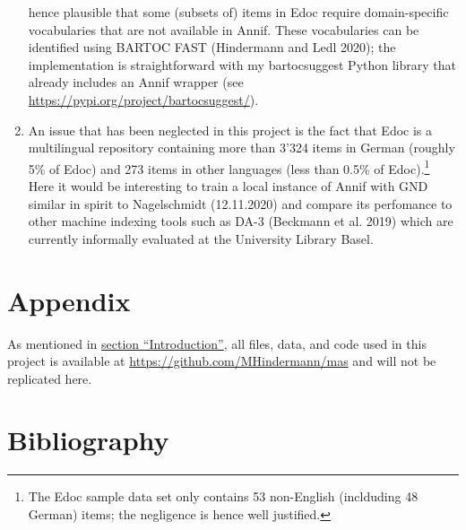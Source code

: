 \begin{enumerate}
  hence plausible that some (subsets of) items in Edoc require
  domain-specific vocabularies that are not available in Annif. These
  vocabularies can be identified using BARTOC FAST (Hindermann and Ledl
  2020); the implementation is straightforward with my bartocsuggest
  Python library that already includes an Annif wrapper (see
  \url{https://pypi.org/project/bartocsuggest/}).
\item
  An issue that has been neglected in this project is the fact that Edoc
  is a multilingual repository containing more than 3'324 items in
  German (roughly 5\% of Edoc) and 273 items in other languages (less
  than 0.5\% of Edoc).\footnote{The Edoc sample data set only contains
    53 non-English (inclduding 48 German) items; the negligence is hence
    well justified.} Here it would be interesting to train a local
  instance of Annif with GND similar in spirit to Nagelschmidt
  (12.11.2020) and compare its perfomance to other machine indexing
  tools such as DA-3 (Beckmann et al. 2019) which are currently
  informally evaluated at the University Library Basel.
\end{enumerate}

\hypertarget{appendix}{%
\section{Appendix}\label{appendix}}

As mentioned in \protect\hyperlink{introduction}{section
``Introduction''}, all files, data, and code used in this project is
available at \url{https://github.com/MHindermann/mas} and will not be
replicated here.

\hypertarget{bibliography}{%
\section{Bibliography}\label{bibliography}}


